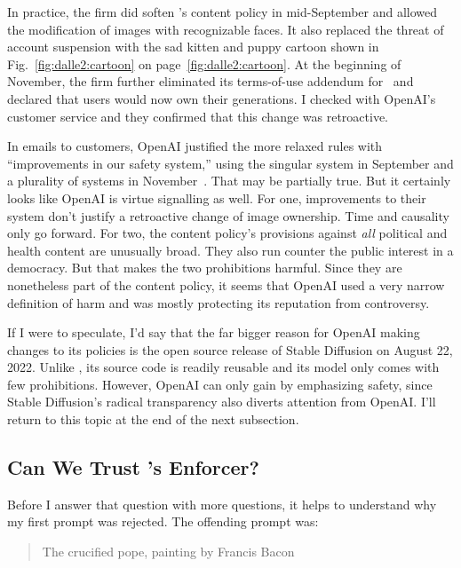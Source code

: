 \sectionbreak{}

\noindent{}In practice, the firm did soften \DALLE's content policy in
mid-September and allowed the modification of images with recognizable faces. It
also replaced the threat of account suspension with the sad kitten and puppy
cartoon shown in Fig.~\ref{fig:dalle2:cartoon} on page~\ref{fig:dalle2:cartoon}.
At the beginning of November, the firm further eliminated its terms-of-use
addendum for \DALLE\ and  declared that users would now own their generations. I
checked with OpenAI's customer service and they confirmed that this change was
retroactive.

In emails to customers, OpenAI justified the more relaxed rules with
``improvements in our safety system,'' using the singular system in September
and a plurality of systems in November~\cite{OpenAI2022f,OpenAI2022g}. That may
be partially true. But it certainly looks like OpenAI is virtue signalling as
well. For one, improvements to their system don't justify a retroactive change
of image ownership. Time and causality only go forward. For two, the content
policy's provisions against \emph{all} political and health content are
unusually broad. They also run counter the public interest in a democracy. But
that makes the two prohibitions harmful. Since they are nonetheless part of the
content policy, it seems that OpenAI used a very narrow definition of harm and
was mostly protecting its reputation from controversy.

If I were to speculate, I'd say that the far bigger reason for OpenAI making
changes to its policies is the open source release of Stable Diffusion on August
22, 2022. Unlike \DALLE, its source code is readily reusable and its model only
comes with few prohibitions. However, OpenAI can only gain by emphasizing
safety, since Stable Diffusion's radical transparency also diverts attention
from OpenAI. I'll return to this topic at the end of the next subsection.


\subsection{Can We Trust \DALLE's Enforcer?}

Before I answer that question with more questions, it helps to understand why my
first prompt was rejected. The offending prompt was:

\begin{quote}
The crucified pope, painting by Francis Bacon
\end{quote}

